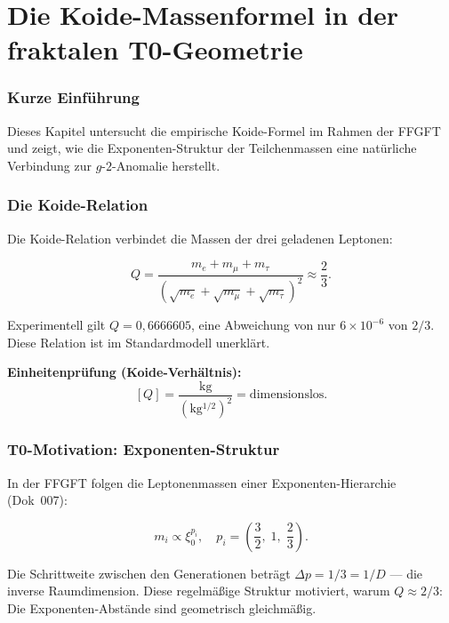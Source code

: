 
	
	\chapter{Die Koide-Massenformel in der fraktalen T0-Geometrie}
	
	\subsection*{Kurze Einführung}
	
	Dieses Kapitel untersucht die empirische Koide-Formel im Rahmen der FFGFT und zeigt, wie die Exponenten-Struktur der Teilchenmassen eine natürliche Verbindung zur \(g\)-\(2\)-Anomalie herstellt.
	
	\subsection*{Die Koide-Relation}
	
	Die Koide-Relation verbindet die Massen der drei geladenen Leptonen:
	
	\begin{equation}
		Q = \frac{m_e + m_\mu + m_\tau}{(\sqrt{m_e} + \sqrt{m_\mu} + \sqrt{m_\tau})^2} \approx \frac{2}{3}.
	\end{equation}
	
	Experimentell gilt \(Q = 0{,}6666605\), eine Abweichung von nur \(6 \times 10^{-6}\) von \(2/3\). Diese Relation ist im Standardmodell unerklärt.
	
	\textbf{Einheitenprüfung (Koide-Verhältnis):}
	\[
	[Q] = \frac{\si{\kilo\gram}}{(\si{\kilo\gram^{1/2}})^2} = \text{dimensionslos}.
	\]
	
	\subsection*{T0-Motivation: Exponenten-Struktur}
	
	In der FFGFT folgen die Leptonenmassen einer Exponenten-Hierarchie (Dok~007):
	
	\begin{equation}
		m_i \propto \xi_0^{p_i}, \quad p_i = \left(\frac{3}{2},\; 1,\; \frac{2}{3}\right).
	\end{equation}
	
	Die Schrittweite zwischen den Generationen beträgt \(\Delta p = 1/3 = 1/D\) — die inverse Raumdimension. Diese regelmäßige Struktur motiviert, warum \(Q \approx 2/3\): Die Exponenten-Abstände sind geometrisch gleichmäßig.
	
